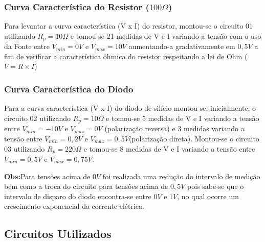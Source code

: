         \subsubsection{Curva Característica do Resistor ($100\Omega$)}
            Para levantar a curva característica (V x I) do resistor, montou-se o circuito 01 utilizando $R_{p}=10\Omega$ e tomou-se 21 medidas
            de V e I variando a tensão com o uso da Fonte entre $V_{min}=0V$ e $V_{max}=10V$ aumentando-a gradativamente em $0,5V$ a fim de
            verificar a característica ôhmica do resistor respeitando a lei de Ohm ($V=R\times I$)
        \subsubsection{Curva Característica do Diodo}
            Para a curva característica (V x I) do diodo de silício montou-se, inicialmente, o circuito 02 utilizando $R_{p}=10\Omega$ e tomou-se 5
            medidas de V e I variando a tensão entre $V_{min}=-10V$ e $V_{max}=0V$ (polarização reversa) e 3 medidas variando a tensão entre
            $V_{min}=0,2V$ e $V_{max}=0,5V$(polarização direta).\newline
            Montou-se o circuito 03 utilizando $R_{p}=220\Omega$ e tomou-se 8 medidas de V e I variando a tensão entre $V_{min}=0,5V$ e $V_{max}=0,75V$.
            \newline
            
            \textbf{Obs:}Para tensões acima de $0V$ foi realizada uma redução do intervalo de medição bem como a troca do circuito para tensões acima de
            $0,5V$ pois sabe-se que o intervalo de disparo do diodo encontra-se entre $0V$ e $1V$, no qual ocorre um crescimento exponencial da corrente
            elétrica.
    \subsection{Circuitos Utilizados}
        
